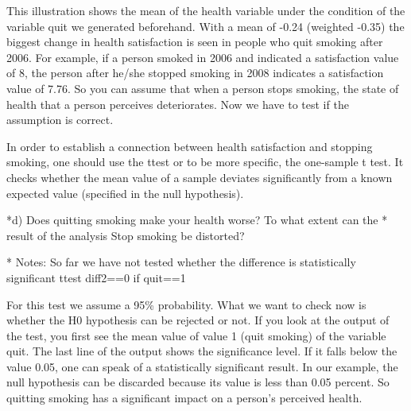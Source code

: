 \documentclass[letterpaper,10pt,openany,onesideH,english]{sphinxmanual}
\begin{document}
This illustration shows the mean of the health variable under the condition of the variable quit we generated beforehand. With a mean of -0.24 (weighted -0.35) the biggest change in health satisfaction is seen in people who quit smoking after 2006. For example, if a person smoked in 2006 and indicated a satisfaction value of 8, the person after he/she stopped smoking in 2008 indicates a satisfaction value of 7.76. So you can assume that when a person stops smoking, the state of health that a person perceives deteriorates. Now we have to test if the assumption is correct.


In order to establish a connection between health satisfaction and stopping smoking, one should use the ttest or to be more specific, the one-sample t test. It checks whether the mean value of a sample deviates significantly from a known expected value (specified in the null hypothesis).

%
\begin{sphinxVerbatim}[commandchars=\\\{\},numbers=left,firstnumber=1,stepnumber=1]
*d) Does quitting smoking make your health worse? To what extent can the 
*   result of the analysis \PYGZdq{}Stop smoking\PYGZdq{} be distorted?
	
	* Notes: So far we have not tested whether the difference is statistically significant
		ttest diff2==0 if quit==1 		
\end{sphinxVerbatim}

\begin{figure}[H]
\centering

\noindent{}
\end{figure}


For this test we assume a 95\% probability. What we want to check now is whether the H0 hypothesis can be rejected or not. If you look at the output of the test, you first see the mean value of value 1 (quit smoking) of the variable quit. The last line of the output shows the significance level. If it falls below the value 0.05, one can speak of a statistically significant result. In our example, the null hypothesis can be discarded because its value is less than 0.05 percent. So quitting smoking has a significant impact on a person’s perceived health.
\end{document}
